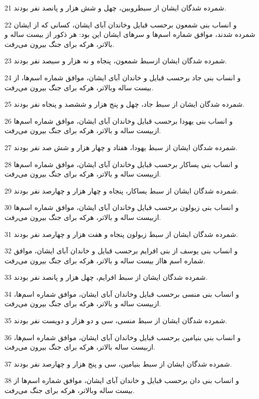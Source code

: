 \par 21 شمرده شدگان ایشان از سبطروبین، چهل و شش هزار و پانصد نفر بودند.
\par 22 و انساب بنی شمعون برحسب قبایل وخاندان آبای ایشان، کسانی که از ایشان شمرده شدند، موافق شماره اسم‌ها و سرهای ایشان این بود: هر ذکور از بیست ساله و بالاتر، هر‌که برای جنگ بیرون می‌رفت.
\par 23 شمرده شدگان ایشان ازسبط شمعون، پنجاه و نه هزار و سیصد نفر بودند.
\par 24 و انساب بنی جاد برحسب قبایل و خاندان آبای ایشان، موافق شماره اسم‌ها، از بیست ساله وبالاتر، هر‌که برای جنگ بیرون می‌رفت.
\par 25 شمرده شدگان ایشان از سبط جاد، چهل و پنج هزار و ششصد و پنجاه نفر بودند.
\par 26 و انساب بنی یهودا برحسب قبایل وخاندان آبای ایشان، موافق شماره اسم‌ها ازبیست ساله و بالاتر، هر‌که برای جنگ بیرون می‌رفت.
\par 27 شمرده شدگان ایشان از سبط یهودا، هفتاد و چهار هزار و شش صد نفر بودند.
\par 28 و انساب بنی یساکار برحسب قبایل وخاندان آبای ایشان، موافق شماره اسم‌ها ازبیست ساله و بالاتر، هر‌که برای جنگ بیرون می‌رفت.
\par 29 شمرده شدگان ایشان از سبط یساکار، پنجاه و چهار هزار و چهارصد نفر بودند.
\par 30 و انساب بنی زبولون برحسب قبایل وخاندان آبای ایشان، موافق شماره اسم‌ها ازبیست ساله و بالاتر، هر‌که برای جنگ بیرون می‌رفت.
\par 31 شمرده شدگان ایشان از سبط زبولون پنجاه و هفت هزار و چهارصد نفر بودند.
\par 32 و انساب بنی یوسف از بنی افرایم برحسب قبایل و خاندان آبای ایشان، موافق شماره اسم هااز بیست ساله و بالاتر، هر‌که برای جنگ بیرون می‌رفت.
\par 33 شمرده شدگان ایشان از سبط افرایم، چهل هزار و پانصد نفر بودند.
\par 34 و انساب بنی منسی برحسب قبایل وخاندان آبای ایشان، موافق شماره اسم‌ها، ازبیست ساله و بالاتر، هر‌که برای جنگ بیرون می‌رفت.
\par 35 شمرده شدگان ایشان از سبط منسی، سی و دو هزار و دویست نفر بودند.
\par 36 و انساب بنی بنیامین برحسب قبایل وخاندان آبای ایشان، موافق شماره اسم‌ها، ازبیست ساله بالاتر، هر‌که برای جنگ بیرون می‌رفت.
\par 37 شمرده شدگان ایشان از سبط بنیامین، سی و پنج هزار و چهارصد نفر بودند.
\par 38 و انساب بنی دان برحسب قبایل و خاندان آبای ایشان، موافق شماره اسم‌ها از بیست ساله وبالاتر، هر‌که برای جنگ می‌رفت.
